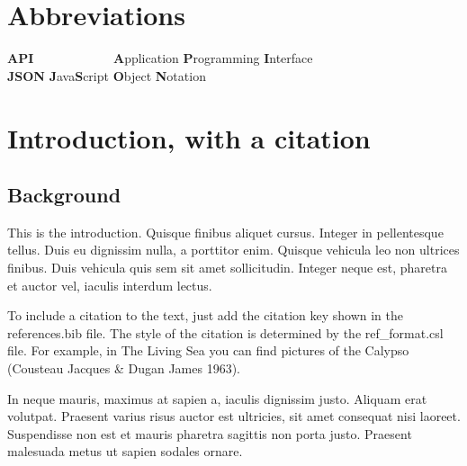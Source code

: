 \documentclass[12pt,a4paper,]{report}
\begin{document}

\tableofcontents

\newpage

\listoffigures

\newpage

\listoftables

\newpage

\hypertarget{abbreviations}{%
\chapter*{Abbreviations}\label{abbreviations}}

\begin{tabbing}
\textbf{API}~~~~~~~~~~~~ \= \textbf{A}pplication \textbf{P}rogramming \textbf{I}nterface \\  
\textbf{JSON} \> \textbf{J}ava\textbf{S}cript \textbf{O}bject \textbf{N}otation \\  
\end{tabbing}

\newpage

\setcounter{page}{1}
\doublespacing
\setlength{\parindent}{0.5in}

\hypertarget{introduction-with-a-citation}{%
\chapter{Introduction, with a
citation}\label{introduction-with-a-citation}}

\hypertarget{background}{%
\section{Background}\label{background}}

This is the introduction. Quisque finibus aliquet cursus. Integer in
pellentesque tellus. Duis eu dignissim nulla, a porttitor enim. Quisque
vehicula leo non ultrices finibus. Duis vehicula quis sem sit amet
sollicitudin. Integer neque est, pharetra et auctor vel, iaculis
interdum lectus.

To include a citation to the text, just add the citation key shown in
the references.bib file. The style of the citation is determined by the
ref\_format.csl file. For example, in The Living Sea you can find
pictures of the Calypso (Cousteau Jacques \& Dugan James 1963).

In neque mauris, maximus at sapien a, iaculis dignissim justo. Aliquam
erat volutpat. Praesent varius risus auctor est ultricies, sit amet
consequat nisi laoreet. Suspendisse non est et mauris pharetra sagittis
non porta justo. Praesent malesuada metus ut sapien sodales ornare.
\end{document}
